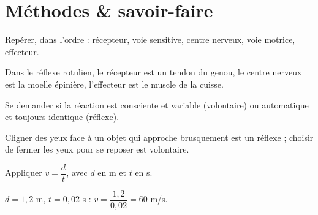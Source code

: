 \section{Méthodes \& savoir-faire}

Repérer, dans l'ordre : récepteur, voie sensitive, centre nerveux, voie motrice,
effecteur.
\begin{exemple}
Dans le réflexe rotulien, le récepteur est un tendon du genou, le centre nerveux est la
moelle épinière, l'effecteur est le muscle de la cuisse.
\end{exemple}

Se demander si la réaction est consciente et variable (volontaire) ou automatique et
toujours identique (réflexe).
\begin{exemple}
Cligner des yeux face à un objet qui approche brusquement est un réflexe ; choisir de
fermer les yeux pour se reposer est volontaire.
\end{exemple}

Appliquer $v=\dfrac dt$, avec $d$ en m et $t$ en s.
\begin{exemple}
$d=1{,}2$ m, $t=0{,}02$ s : $v=\dfrac{1{,}2}{0{,}02}=60$ m/s.
\end{exemple}

